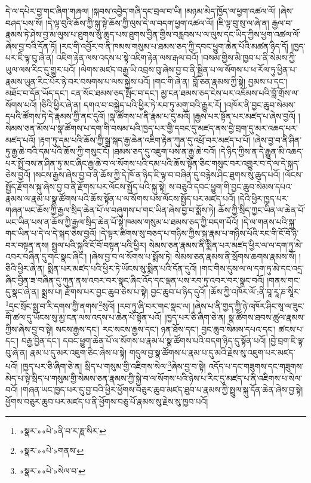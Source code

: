 དེ་ལ་དཔེར་བྱ་གང་ཞིག་གཞལ། །སྐབས་འབྱེད་གཞི་དང་བྲལ་བ་ཡི། །མཉམ་མེད་ཁྱོད་ལ་ཕྱག་འཚལ་ལོ། །ཞེས་བཤད་པས་སོ། །དེ་ལྟ་བུའི་ཆོས་ཀྱི་སྐུ་སྟེ་ཆོས་ཀྱི་ལུས་དེ་ལ་བདག་ཕྱག་འཚལ་ལོ། །ཇི་ལྟ་བུ་སུ་ལ་ཞེ་ན། རྒྱལ་བ་རྣམས་ཏེ་ཤེས་བྱ་མ་ལུས་པ་ཐུགས་སུ་ཆུད་པས་ཐུགས་བྱིན་གྱིས་བརླབས་པ་ལ་ལུས་དང་ཡིད་ཀྱིས་ཕྱག་འཚལ་ལོ་ཞེས་བྱ་བའི་དོན་ཏོ། །རང་གི་འབྱོར་བ་ནི་ཁམས་གསུམ་པ་ཐམས་ཅད་ཀྱི་དབང་ཕྱུག་ཆེན་པོའི་མཚན་ཉིད་དོ། །ཁྱད་པར་ཇི་ལྟ་བུ་ཞེ་ན། འཇིག་རྟེན་ལས་འདས་པ་སྟེ་འཇིག་རྟེན་ལས་རྒལ་བའོ། །བསམ་གྱིས་མི་ཁྱབ་པ་ནི་སེམས་ཀྱི་ཡུལ་ལས་རིང་དུ་གྱུར་པའོ། །ལེགས་མཛད་བརྒྱ་ཡི་འབྲས་བུ་ཞེས་བྱ་བ་ནི་སྦྱིན་པ་ལ་སོགས་པ་ཕ་རོལ་ཏུ་ཕྱིན་པ་རྣམས་ཡུན་རིང་པོར་ཉེ་བར་བསགས་པ་ལས་སྐྱེས་པའོ། །གང་གི་ཞེ་ན། བློ་ཅན་རྣམས་ཀྱི་སྟེ། བྱམས་པ་དང་། མཐོང་བ་དོན་ཡོད་དང་། ངན་སོང་ཐམས་ཅད་སྤོང་བ་དང་། མྱ་ངན་ཐམས་ཅད་ངེས་པར་འཇོམས་པའི་བློ་གྲོས་ལ་སོགས་པའོ། །ཅིའི་ཕྱིར་ཞེ་ན། དགའ་བ་བསྐྱེད་པའི་ཕྱིར་ཏེ་རབ་ཏུ་མགུ་བའི་རྒྱུར་རོ། །འཁོར་ནི་བྱང་ཆུབ་སེམས་དཔའི་ཚོགས་ཏེ་དེ་རྣམས་ཀྱི་ནང་དུའོ། །སྣ་ཚོགས་པ་ནི་རྣམ་པ་དུ་མའོ། །རྒྱས་པར་སྟོན་པར་མཛད་པ་ཞེས་བྱའོ། །སེམས་ཅན་མོས་པ་སྣ་ཚོགས་པ་དག་གི་བསམ་པའི་ཁྱད་པར་གྱི་དབང་དུ་མཛད་ནས་བྱེ་བྲག་དུ་མར་འཆད་པར་མཛད་པའོ། །རྟག་ཏུ་དམ་པའི་ཆོས་ཀྱི་སྒྲ་སྐད་རྒྱ་ཆེན་འཇིག་རྟེན་ཀུན་དུ་འཕྲོ་བར་མཛད་པ་པོ། །ཞེས་བྱ་བ་ནི་ཤིན་ཏུ་རྒྱ་ཆེ་བའི་དམ་པའི་ཆོས་ཀྱི་གསུང་ངོ། །ཐམས་ཅད་དུ་འཇུག་པས་ན་རྒྱ་ཆེ་བའོ། །དེ་ཉིད་ཀྱིས་ན་དེ་རྒྱུན་མི་འཆད་པར་སྤྲོ་བས་ན་ཤིན་ཏུ་མང་ཞིང་རྒྱ་ཆེ་བ་ལ་སོགས་པའི་དམ་པའི་ཆོས་སྟོན་ཅིང་གསུང་བར་འགྱུར་བ་དེ་ལ་དེ་སྐད་ཅེས་བྱའོ། །སངས་རྒྱས་ཞེས་བྱ་བ་ནི་ཆོས་ཀྱི་དེ་ཁོ་ན་ཉིད་ཇི་ལྟ་བ་བཞིན་དུ་བརྙེས་ཤིང་ཐུགས་སུ་ཆུད་པའོ། །ལོངས་སྤྱོད་རྫོགས་སྐུ་ཞེས་བྱ་བ་ནི་རྫོགས་པར་ལོངས་སྤྱོད་པའི་སྐུ་སྟེ། ས་བཅུའི་དབང་ཕྱུག་གི་བྱང་ཆུབ་སེམས་དཔའ་རྣམས་ལ་རྣམ་པ་སྣ་ཚོགས་པའི་ཆོས་སྟོན་པ་ལ་སོགས་པས་ལོངས་སྤྱོད་པར་མཛད་པའོ། །དེའི་ཕྱིར་ཁྱད་པར་གཞན་ཡང་ཆོས་ཀྱི་རྒྱལ་སྲིད་ཆེན་པོ་ལ་བཞུགས་པ་གང་ཡིན་ཞེས་བྱ་བ་སྨོས་ཏེ། ཆོས་ཀྱི་སྲིད་ཀྱང་ཡིན་ལ་ཆེན་པོ་ཡང་ཡིན་པས་ན་ཆོས་ཀྱི་རྒྱལ་སྲིད་ཆེན་པོ་སྟེ་ཁམས་གསུམ་པ་ཐམས་ཅད་ཀྱི་བདག་པོའོ། །དེ་ལ་གནས་པའི་སྐུ་གང་ཡིན་པ་དེ་ལ་དེ་སྐད་ཅེས་བྱའོ། །དེ་ལྟར་ཚིགས་སུ་བཅད་པ་གཉིས་ཀྱིས་སྐུ་རྣམ་པ་གཉིས་པོའི་རང་གི་ངོ་བོ་ཉེ་བར་བསྟན་ནས། སྤྲུལ་པའི་སྐུའི་ངོ་བོ་བསྟན་པའི་ཕྱིར། སེམས་ཅན་རྣམས་ནི་སྨིན་པར་མཛད་ཕྱིར་ལ་ལ་དག་ཏུ་མེ་འབར་བཞིན་དུ་གང་སྣང་ཞིང་། །ཞེས་བྱ་བ་ལ་སོགས་པ་སྨོས་ཏེ། སེམས་ཅན་རྣམས་ནི་སྲོགས་ཆགས་རྣམས་སོ། །ཅིའི་ཕྱིར་ཞེ་ན། སྨིན་པར་མཛད་པའི་ཕྱིར་ཏེ་ཡོངས་སུ་སྨིན་པའི་དོན་དུའོ། །གང་གིས་དུས་ལ་ལ་དག་ཏུ་མེ་དང་འདྲ་ཞིང་བྱིན་ཟ་བཞིན་དུ་ཀུན་ནས་འབར་བར་སྣང་ཞིང་འོད་དང་ལྡན་པས་རབ་ཏུ་འབར་བར་སྣང་བའོ། །གནས་གང་དུ་སྣང་ཞེ་ན། སྨྲས་པ། རྫོགས་པར་བྱང་ཆུབ་ཅེས་པ་སྟེ། བྱང་ཆུབ་པ་ཉིད་དུའོ། །ཆོས་ཀྱི་འཁོར་ལོ་:ནི་བཱ་རཱ་ཎ་སཱིར་\footnote{«སྣར་»«པེ་»ནི་བ་ར་ཎཱ་སིར་}དྲང་སྲོང་སྨྲ་བ་རི་དགས་ཀྱི་ནགས་\footnote{«སྣར་»«པེ་»གནས་}སུའོ། །རབ་ཏུ་ཞི་བར་གང་སྣང་ལ། །ཞེས་པ་ནི་གྱད་ཀྱི་ཉེ་འཁོར་ཤིང་སཱ་ལ་ཟུང་གི་ཚལ་དུ་ཡོངས་སུ་མྱ་ངན་ལས་འདས་པ་ཆེན་པོ་སྟོན་པའོ། །ཁྱད་པར་ཅི་ཞིག་ཅེ་ན། སྣ་ཚོགས་ཐབས་ཚུལ་རྣམས་ཀྱིས་ཞེས་བྱ་བ་སྟེ། སངས་རྒྱས་དང་། རང་སངས་རྒྱས་དང་། ཉན་ཐོས་དང་། བྱང་ཆུབ་སེམས་དཔའ་དང་། ཚངས་པ་དང་། བརྒྱ་བྱིན་དང་། དབང་ཕྱུག་ཆེན་པོ་ལ་སོགས་པ་རྣམ་པ་སྣ་ཚོགས་པའི་བདག་ཉིད་དུ་སྟོན་པའོ། །བྱེ་བྲག་ཇི་ལྟ་བུ་ཞེ་ན། རྣམ་པ་དུ་མར་འཇུག་ཅིང་ཞེས་པ་སྟེ། གདུལ་བྱ་སྣ་ཚོགས་པ་རྣམ་པ་དུ་མའི་རྗེས་སུ་འཇུག་པར་མཛད་པའོ། །ཁྱད་པར་ཅི་ཞིག་ཅེ་ན། སྲིད་པ་གསུམ་གྱི་འཇིགས་སེལ་\footnote{«སྣར་»«པེ་»སེལ་བ་}ཞེས་བྱ་བ་སྟེ། འདོད་པ་དང་གཟུགས་དང་གཟུགས་མེད་པ་སྟེ་སྲིད་པ་གསུམ་གྱི་སེམས་ཅན་རྣམས་ཀྱི་སྐྱེ་བ་ལ་སོགས་པའི་ཉེས་པ་རིང་དུ་མཛད་པ་ནི་འཇིགས་པ་སེལ་བའོ། །གཞན་ཡང་ཁྱད་པར་དུ་བྱ་བའི་ཕྱིར་ཕྱོགས་བཅུར་ཆུབ་མཛད་ཐུབ་པ་རྣམས་ཀྱི་སྤྲུལ་སྐུ་དོན་ཆེན་ཞེས་བྱ་སྟེ། ཕྱོགས་བཅུར་ཆུབ་པར་མཛད་པ་ནི་ཕྱོགས་བཅུ་པོ་རྣམས་སུ་རྗེས་སུ་ཁྱབ་པའོ། 